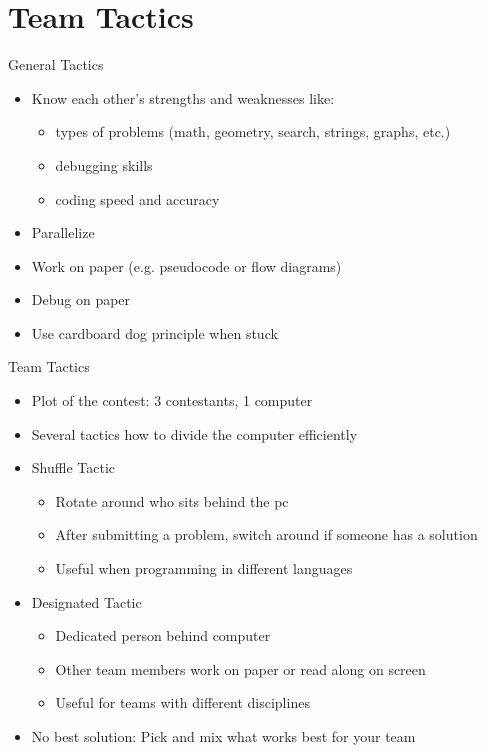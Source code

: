 \documentclass[11pt,pdf, aspectratio=169]{beamer}
\begin{document}
  \section{Team Tactics}
  \begin{frame}{General Tactics}
    \begin{itemize}
      \item Know each other's strengths and weaknesses like:
      \begin{itemize}
        \item types of problems (math, geometry, search, strings, graphs, etc.)
        \item debugging skills
        \item coding speed and accuracy
      \end{itemize}
      \item Parallelize
      \item Work on paper (e.g. pseudocode or flow diagrams)
      \item Debug on paper
      \item Use cardboard dog principle when stuck
    \end{itemize}
  \end{frame}
  \begin{frame}{Team Tactics}
    \begin{itemize}
      \item<1-> Plot of the contest: 3 contestants, 1 computer
      \item<2-> Several tactics how to divide the computer efficiently
      \item<3-> Shuffle Tactic\begin{itemize}
                                \item<4-> Rotate around who sits behind the pc
                                \item<4-> After submitting a problem, switch around if someone has a solution
                                \item<4-> Useful when programming in different languages
      \end{itemize}
      \item<3-> Designated Tactic\begin{itemize}
                                   \item<5->Dedicated person behind computer
                                   \item<5-> Other team members work on paper or read along on screen
                                   \item<5-> Useful for teams with different disciplines
      \end{itemize}
      \item<3-> No best solution: Pick and mix what works best for your team
    \end{itemize}
  \end{frame}
\end{document}
